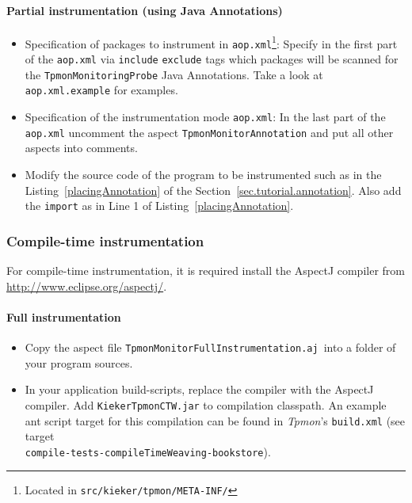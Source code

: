 \documentclass[a4paper,12pt]{scrartcl}
\newcommand{\tpmon}{\textit{Tpmon}}
\begin{document}
\paragraph{Partial instrumentation (using Java Annotations)}
\begin{itemize}
 \item Specification of packages to instrument in \texttt{aop.xml}\footnote{Located in \texttt{src/kieker/tpmon/META-INF/}}: Specify in the first part of the \texttt{aop.xml} via \texttt{include} \texttt{exclude} tags which packages will be scanned for the \texttt{TpmonMonitoringProbe} Java Annotations. Take a look at  \texttt{aop.xml.example} for examples.
\item Specification of the instrumentation mode \texttt{aop.xml}: In the last part of the \texttt{aop.xml} uncomment the aspect \texttt{TpmonMonitorAnnotation} and put all other aspects into comments.
\item Modify the source code of the program to be instrumented such as in the Listing~\ref{placingAnnotation} of the Section~\ref{sec.tutorial.annotation}. Also add the \texttt{import} as in Line 1 of Listing~\ref{placingAnnotation}.
\end{itemize}

\subsubsection{Compile-time instrumentation}

For compile-time instrumentation, it is required install the AspectJ compiler from \url{http://www.eclipse.org/aspectj/}.

\paragraph{Full instrumentation}
\begin{itemize}
 \item Copy the aspect file \small \texttt{TpmonMonitorFullInstrumentation.aj}\normalsize\ into a folder of your program sources.
\item In your application build-scripts, replace the compiler with the AspectJ compiler. Add \texttt{KiekerTpmonCTW.jar} to compilation classpath. An example ant script target for this compilation can be found in \tpmon's \texttt{build.xml} (see target \\ \texttt{compile-tests-compileTimeWeaving-bookstore}).
\end{itemize}
\end{document}
